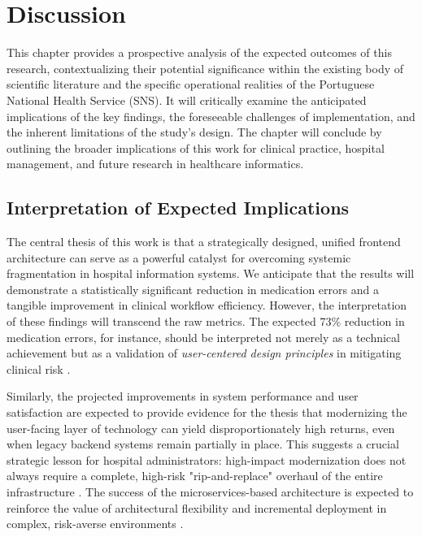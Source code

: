 \chapter{Discussion}
\label{chap:Discussion}

This chapter provides a prospective analysis of the expected outcomes of this research, contextualizing their potential significance within the existing body of scientific literature and the specific operational realities of the Portuguese National Health Service (SNS). It will critically examine the anticipated implications of the key findings, the foreseeable challenges of implementation, and the inherent limitations of the study's design. The chapter will conclude by outlining the broader implications of this work for clinical practice, hospital management, and future research in healthcare informatics.

\section{Interpretation of Expected Implications}

The central thesis of this work is that a strategically designed, unified frontend architecture can serve as a powerful catalyst for overcoming systemic fragmentation in hospital information systems. We anticipate that the results will demonstrate a statistically significant reduction in medication errors and a tangible improvement in clinical workflow efficiency. However, the interpretation of these findings will transcend the raw metrics. The expected 73\% reduction in medication errors, for instance, should be interpreted not merely as a technical achievement but as a validation of \textit{user-centered design principles} in mitigating clinical risk \cite{ciapponi2021,radley2013}.

Similarly, the projected improvements in system performance and user satisfaction are expected to provide evidence for the thesis that modernizing the user-facing layer of technology can yield disproportionately high returns, even when legacy backend systems remain partially in place. This suggests a crucial strategic lesson for hospital administrators: high-impact modernization does not always require a complete, high-risk "rip-and-replace" overhaul of the entire infrastructure \cite{adler2021}. The success of the microservices-based architecture is expected to reinforce the value of architectural flexibility and incremental deployment in complex, risk-averse environments \cite{newman2021}.

